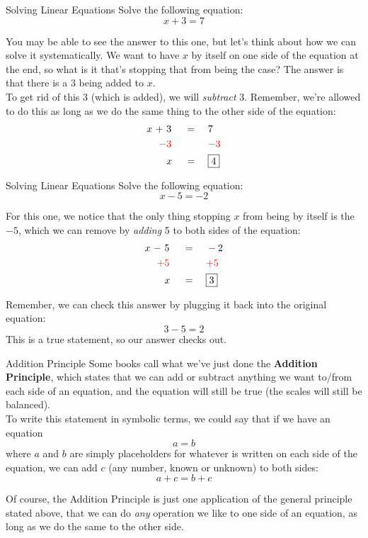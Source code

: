\begin{example}{Solving Linear Equations}
Solve the following equation:
\[x + 3 = 7\]

\sol
You may be able to see the answer to this one, but let's think about how we can solve it systematically.  We want to have $x$ by itself on one side of the equation at the end, so what is it that's stopping that from being the case?  The answer is that there is a 3 being added to $x$.\\

To get rid of this 3 (which is added), we will \emph{subtract} 3.  Remember, we're allowed to do this as long as we do the same thing to the other side of the equation:
\begin{alignat*}{3}
x\ +\ &3\ &&=\ &&7\\
{\color{red}-}&{\color{red}3}\ &&\ &&{\color{red}-3}\\
&x &&=\ &&\boxed{4}
\end{alignat*}
\end{example}

\begin{example}{Solving Linear Equations}
Solve the following equation:
\[x - 5 = -2\]

\sol
For this one, we notice that the only thing stopping $x$ from being by itself is the $-5$, which we can remove by \emph{adding} 5 to both sides of the equation:\
\begin{alignat*}{3}
x\ -\ &5\ &&=\ &&-2\\
{\color{red}+}&{\color{red}5}\ &&\ &&{\color{red}+5}\\
&x &&=\ &&\boxed{3}
\end{alignat*}

Remember, we can check this answer by plugging it back into the original equation:
\[3 - 5 = 2\]  This is a true statement, so our answer checks out.
\end{example}

\begin{proc}{Addition Principle}
Some books call what we've just done the \textbf{Addition Principle}, which states that we can add or subtract anything we want to/from each side of an equation, and the equation will still be true (the scales will still be balanced).\\

To write this statement in symbolic terms, we could say that if we have an equation \[a = b\] where $a$ and $b$ are simply placeholders for whatever is written on each side of the equation, we can add $c$ (any number, known or unknown) to both sides: \[a + c = b + c\]

Of course, the Addition Principle is just one application of the general principle stated above, that we can do \emph{any} operation we like to one side of an equation, as long as we do the same to the other side.
\end{proc}

